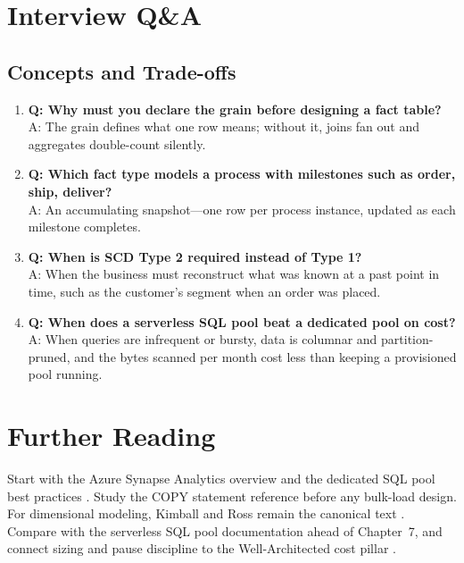 \section{Interview Q\&A}
\subsection{Concepts and Trade-offs}
\begin{enumerate}
    \item \textbf{Q: Why must you declare the grain before designing a fact table?}\\
    A: The grain defines what one row means; without it, joins fan out and aggregates double-count silently.
    \item \textbf{Q: Which fact type models a process with milestones such as order, ship, deliver?}\\
    A: An accumulating snapshot---one row per process instance, updated as each milestone completes.
    \item \textbf{Q: When is SCD Type 2 required instead of Type 1?}\\
    A: When the business must reconstruct what was known at a past point in time, such as the customer's segment when an order was placed.
    \item \textbf{Q: When does a serverless SQL pool beat a dedicated pool on cost?}\\
    A: When queries are infrequent or bursty, data is columnar and partition-pruned, and the bytes scanned per month cost less than keeping a provisioned pool running.
\end{enumerate}

\section{Further Reading}
Start with the Azure Synapse Analytics overview \cite{microsoft2025synapse} and the dedicated SQL pool best practices \cite{microsoft2025synapseDedicatedBest}. Study the COPY statement reference \cite{microsoft2025synapseCopy} before any bulk-load design. For dimensional modeling, Kimball and Ross remain the canonical text \cite{kimball2013dwtk}. Compare with the serverless SQL pool documentation \cite{microsoft2025synapseServerless} ahead of Chapter~7, and connect sizing and pause discipline to the Well-Architected cost pillar \cite{microsoft2025wellarchitected}.

